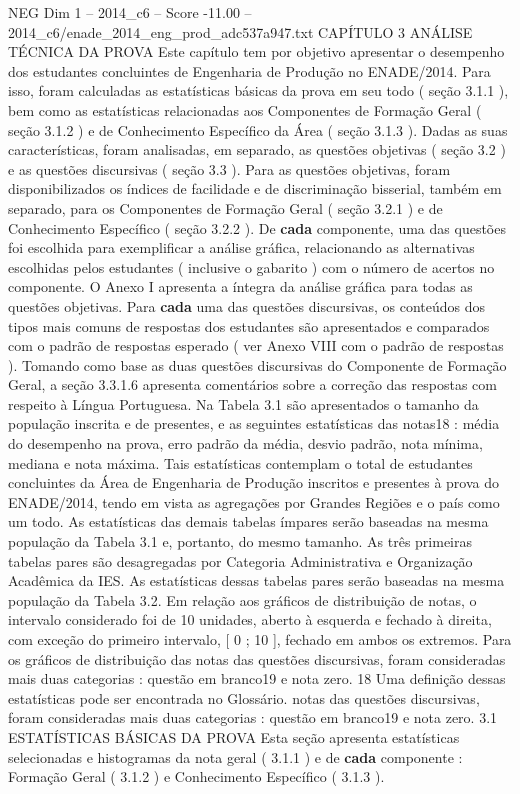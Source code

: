 \begin{textsample}{NEG Dim 1 – 2014\_c6 – Score -11.00 – 2014\_c6/enade\_2014\_eng\_prod\_adc537a947.txt}  \label{ex:f1_neg_002}
CAPÍTULO 3 ANÁLISE TÉCNICA DA PROVA Este capítulo tem por objetivo apresentar o desempenho dos estudantes concluintes de Engenharia de Produção no ENADE/2014.
Para isso, foram calculadas as estatísticas básicas da prova em seu todo ( seção 3.1.1 ), bem como as estatísticas relacionadas aos Componentes de Formação Geral ( seção 3.1.2 ) e de Conhecimento Específico da Área ( seção 3.1.3 ).
Dadas as suas características, foram analisadas, em separado, as questões objetivas ( seção 3.2 ) e as questões discursivas ( seção 3.3 ).
Para as questões objetivas, foram disponibilizados os índices de facilidade e de discriminação bisserial, também em separado, para os Componentes de Formação Geral ( seção 3.2.1 ) e de Conhecimento Específico ( seção 3.2.2 ).
De \textbf{cada} componente, uma das questões foi escolhida para exemplificar a análise gráfica, relacionando as alternativas escolhidas pelos estudantes ( inclusive o gabarito ) com o número de acertos no componente.
O Anexo I apresenta a íntegra da análise gráfica para todas as questões objetivas.
Para \textbf{cada} uma das questões discursivas, os conteúdos dos tipos mais comuns de respostas dos estudantes são apresentados e comparados com o padrão de respostas esperado ( ver Anexo VIII com o padrão de respostas ).
Tomando como base as duas questões discursivas do Componente de Formação Geral, a seção 3.3.1.6 apresenta comentários sobre a correção das respostas com respeito à Língua Portuguesa.
Na Tabela 3.1 são apresentados o tamanho da população inscrita e de presentes, e as seguintes estatísticas das notas18 : média do desempenho na prova, erro padrão da média, desvio padrão, nota mínima, mediana e nota máxima.
Tais estatísticas contemplam o total de estudantes concluintes da Área de Engenharia de Produção inscritos e presentes à prova do ENADE/2014, tendo em vista as agregações por Grandes Regiões e o país como um todo.
As estatísticas das demais tabelas ímpares serão baseadas na mesma população da Tabela 3.1 e, portanto, do mesmo tamanho.
As três primeiras tabelas pares são desagregadas por Categoria Administrativa e Organização Acadêmica da IES.
As estatísticas dessas tabelas pares serão baseadas na mesma população da Tabela 3.2.
Em relação aos gráficos de distribuição de notas, o intervalo considerado foi de 10 unidades, aberto à esquerda e fechado à direita, com exceção do primeiro intervalo, [ 0 ; 10 ], fechado em ambos os extremos.
Para os gráficos de distribuição das notas das questões discursivas, foram consideradas mais duas categorias : questão em branco19 e nota zero. 18 Uma definição dessas estatísticas pode ser encontrada no Glossário. notas das questões discursivas, foram consideradas mais duas categorias : questão em branco19 e nota zero. 3.1 ESTATÍSTICAS BÁSICAS DA PROVA Esta seção apresenta estatísticas selecionadas e histogramas da nota geral ( 3.1.1 ) e de \textbf{cada} componente : Formação Geral ( 3.1.2 ) e Conhecimento Específico ( 3.1.3 ).

\end{textsample}
